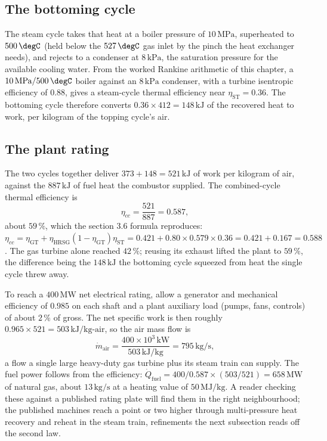 

\subsection{The bottoming cycle}

The steam cycle takes that heat at a boiler pressure of $10\,\text{MPa}$,
superheated to $500\,\degC$ (held below the $527\,\degC$ gas inlet by the
pinch the heat exchanger needs), and rejects to a condenser at
$8\,\text{kPa}$, the saturation pressure for the available cooling water.
From the worked Rankine arithmetic of this chapter, a $10\,\text{MPa}/
500\,\degC$ boiler against an $8\,\text{kPa}$ condenser, with a turbine
isentropic efficiency of $0.88$, gives a steam-cycle thermal efficiency
near $\eta_{\text{ST}} = 0.36$. The bottoming cycle therefore converts
$0.36 \times 412 = 148\,\text{kJ}$ of the recovered heat to work, per
kilogram of the topping cycle's air.

\subsection{The plant rating}

The two cycles together deliver $373 + 148 = 521\,\text{kJ}$ of work per
kilogram of air, against the $887\,\text{kJ}$ of fuel heat the combustor
supplied. The combined-cycle thermal efficiency is
\[
\eta_{cc} = \frac{521}{887} = 0.587,
\]
about $59\,\%$, which the section 3.6 formula reproduces:
$\eta_{cc} = \eta_{\text{GT}} + \eta_{\text{HRSG}}(1 - \eta_{\text{GT}})
\eta_{\text{ST}} = 0.421 + 0.80 \times 0.579 \times 0.36 = 0.421 + 0.167
= 0.588$. The gas turbine alone reached $42\,\%$; reusing its exhaust
lifted the plant to $59\,\%$, the difference being the $148\,\text{kJ}$
the bottoming cycle squeezed from heat the single cycle threw away.

To reach a $400\,\text{MW}$ net electrical rating, allow a generator and
mechanical efficiency of $0.985$ on each shaft and a plant auxiliary load
(pumps, fans, controls) of about $2\,\%$ of gross. The net specific work
is then roughly $0.965 \times 521 = 503\,\text{kJ}/\text{kg-air}$, so the
air mass flow is
\[
\dot m_{\text{air}} = \frac{400 \times 10^3\,\si{\kilo\watt}}
{503\,\text{kJ}/\text{kg}} = 795\,\text{kg}/\text{s},
\]
a flow a single large heavy-duty gas turbine plus its steam train can
supply. The fuel power follows from the efficiency: $\dot Q_{\text{fuel}}
= 400/0.587 \times (503/521) = 658\,\text{MW}$ of natural gas, about
$13\,\text{kg}/\text{s}$ at a heating value of $50\,\text{MJ}/\text{kg}$.
A reader checking these against a published rating plate will find them in
the right neighbourhood; the published machines reach a point or two
higher through multi-pressure heat recovery and reheat in the steam
train, refinements the next subsection reads off the second law.

